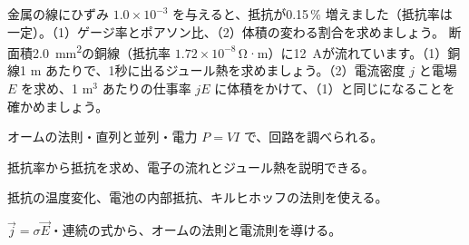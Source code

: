 \bkproblem 金属の線にひずみ $1.0\times10^{-3}$ を与えると、抵抗が0.15\,\% 増えました（抵抗率は一定）。（1）ゲージ率とポアソン比、（2）体積の変わる割合を求めましょう。
\bkproblem 断面積\qty{2.0}{mm^2}の銅線（抵抗率 $1.72\times10^{-8}$\,Ω·m）に\qty{12}{A}が流れています。（1）銅線1 m あたりで、1秒に出るジュール熱を求めましょう。（2）電流密度 $j$ と電場 $E$ を求め、1 m$^3$ あたりの仕事率 $jE$ に体積をかけて、（1）と同じになることを確かめましょう。

\begin{furikaeri}
\begin{checklist}
\item オームの法則・直列と並列・電力 $P=VI$ で、回路を調べられる。
\item 抵抗率から抵抗を求め、電子の流れとジュール熱を説明できる。
\item 抵抗の温度変化、電池の内部抵抗、キルヒホッフの法則を使える。
\item $\vec j=\sigma\vec E$・連続の式から、オームの法則と電流則を導ける。
\end{checklist}
\end{furikaeri}
